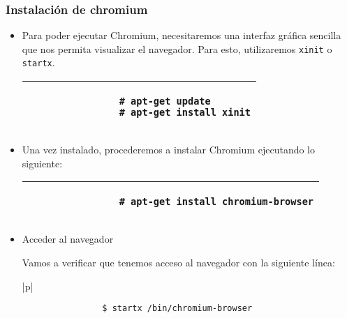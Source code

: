 \documentclass[report,12pt]{article}
\begin{document}
	\subsubsection{Instalación de chromium}
	\begin{itemize}
	\item Para poder ejecutar Chromium, necesitaremos una interfaz gráfica sencilla que nos permita visualizar el navegador. Para esto, utilizaremos \texttt{xinit} o \texttt{startx}. \cite{raspberrypi_forum}\par
	
	\vspace{-1cm}
				\begin{table}[h]
		\centering
		\small %
		\color{gray} %
		\begin{tabular}{|p{\linewidth}|}
			\hline
			\begin{verbatim}
				# apt-get update
				# apt-get install xinit
			\end{verbatim}
			\\
			\hline
		\end{tabular}
	\end{table}
	\vspace{-1cm}
	\item Una vez instalado, procederemos a instalar Chromium ejecutando lo siguiente:\par
		\vspace{-1cm}
	\begin{table}[h]
		\centering
		\small %
		\color{gray} %
		\begin{tabular}{|p{\linewidth}|}
			\hline
			\begin{verbatim}
				# apt-get install chromium-browser
			\end{verbatim}
			\\
			\hline
		\end{tabular}
	\end{table}
	\vspace{-1cm}
	
	\item Acceder al navegador \par
	Vamos a verificar que tenemos acceso al navegador con la siguiente línea:
	
		\vspace{-1cm}
	\begin{table}[h]
		\centering
		\small %
		\color{gray} %
		\begin{tabular}{|p{\linewidth}|}
			\hline
			\begin{verbatim}
				$ startx /bin/chromium-browser
			\end{verbatim}
			\\
			\hline
		\end{tabular}
	\end{table}
	\vspace{-1cm}
	
	\end{itemize}
	
\end{document}
